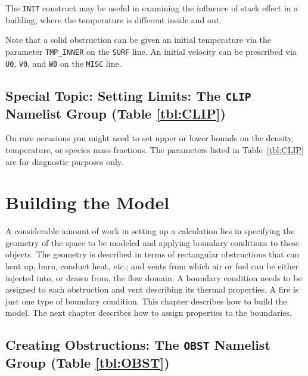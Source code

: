 \documentclass[11pt]{book}
\newcommand{\ct}{\tt\small}
\begin{document}
The {\ct INIT} construct may be useful in examining the influence of
stack effect  in a building, where the temperature
is different inside and out.

Note that a solid obstruction can be given an initial temperature via the
parameter {\ct TMP\_INNER} on the {\ct SURF} line. An initial velocity
can be prescribed via {\ct U0}, {\ct V0}, and {\ct W0} on the {\ct MISC} line.



\section{Special Topic: Setting Limits: The \texorpdfstring{{\tt CLIP}}{CLIP} Namelist Group (Table \ref{tbl:CLIP})}
\label{info:CLIP}

On rare occasions you might need to set upper or lower bounds on the density, temperature, or species mass fractions. The parameters
listed in Table~\ref{tbl:CLIP} are for diagnostic purposes only.








\chapter{Building the Model}

A considerable amount of work in setting up a calculation lies in specifying the
geometry of the space to be modeled and applying boundary conditions
to these objects. The geometry is described in terms
of rectangular obstructions that can heat up, burn, conduct heat, {\em etc.};
and vents from which air or fuel can be
either injected into, or drawn from, the flow domain.
A boundary condition needs to be assigned to each obstruction
and vent describing its thermal properties. A fire is just one type of
boundary condition. This chapter describes how to build the model. The next
chapter describes how to assign properties to the boundaries.



\section{Creating Obstructions: The \texorpdfstring{{\tt OBST}}{OBST} Namelist Group (Table \ref{tbl:OBST})}
\label{info:OBST}
\end{document}
